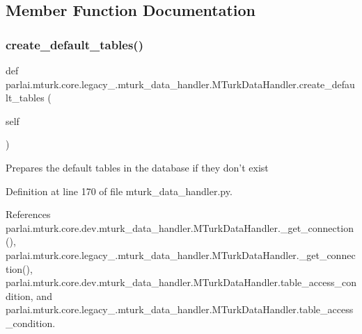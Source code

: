 \subsection{Member Function Documentation}
\mbox{\label{classparlai_1_1mturk_1_1core_1_1legacy__2018_1_1mturk__data__handler_1_1MTurkDataHandler_ab2c424e19bb6a0cb664de78869df362a}} 
\subsubsection{\texorpdfstring{create\+\_\+default\+\_\+tables()}{create\_default\_tables()}}
{\footnotesize\ttfamily def parlai.\+mturk.\+core.\+legacy\+\_.\+mturk\+\_\+data\+\_\+handler.\+M\+Turk\+Data\+Handler.\+create\+\_\+default\+\_\+tables (\begin{DoxyParamCaption}\item[{}]{self }\end{DoxyParamCaption})}

\begin{DoxyVerb}Prepares the default tables in the database if they don't exist\end{DoxyVerb}
 

Definition at line 170 of file mturk\+\_\+data\+\_\+handler.\+py.



References parlai.\+mturk.\+core.\+dev.\+mturk\+\_\+data\+\_\+handler.\+M\+Turk\+Data\+Handler.\+\_\+get\+\_\+connection(), parlai.\+mturk.\+core.\+legacy\+\_.\+mturk\+\_\+data\+\_\+handler.\+M\+Turk\+Data\+Handler.\+\_\+get\+\_\+connection(), parlai.\+mturk.\+core.\+dev.\+mturk\+\_\+data\+\_\+handler.\+M\+Turk\+Data\+Handler.\+table\+\_\+access\+\_\+condition, and parlai.\+mturk.\+core.\+legacy\+\_.\+mturk\+\_\+data\+\_\+handler.\+M\+Turk\+Data\+Handler.\+table\+\_\+access\+\_\+condition.

